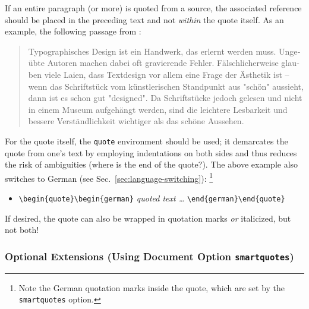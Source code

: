 If an entire paragraph (or more) is quoted from a source, the associated reference
should
be placed in the preceding text and not \emph{within} the quote itself. As an
example, the following passage from \cite{Daniel2018}:
%
\begin{quote}
	\begin{german}
		Typographisches Design ist ein Handwerk, das erlernt werden muss.
		Ungeübte Autoren machen dabei oft gravierende Fehler. Fälschlicherweise
		glauben viele Laien, dass Textdesign vor allem eine Frage der Ästhetik
		ist -- wenn das Schriftstück vom künstlerischen Standpunkt aus "schön"
		aussieht, dann ist es schon gut "designed". Da Schriftstücke jedoch
		gelesen und nicht in einem Museum aufgehängt werden, sind die leichtere
		Lesbarkeit und bessere Verständlichkeit wichtiger als das schöne
		Aussehen.
	\end{german}
\end{quote}
%
For the quote itself, the \texttt{quote} environment should be used; it
demarcates the quote from one's text by employing indentations on both sides and
thus reduces the risk of ambiguities (where is the end of the quote?). The above
example also switches to German (see Sec.\ \ref{sec:language-switching}):%
\footnote{Note the German quotation marks inside the quote, which
are set by the \texttt{smartquotes} option.}
%
\begin{itemize}
    \item[] \verb!\begin{quote}\begin{german}! \emph{quoted text \ldots}
    \verb!\end{german}\end{quote}!
\end{itemize}
%
If desired, the quote can also be wrapped in quotation marks \emph{or}
italicized, but not both!

\subsubsection{Optional Extensions (Using Document Option
\texttt{smartquotes})}

